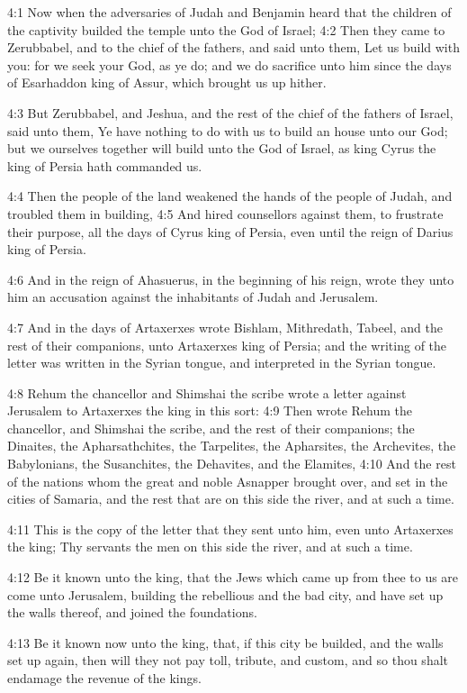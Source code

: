 4:1 Now when the adversaries of Judah and Benjamin heard that the children of the captivity builded the temple unto the \LORD God of Israel; 4:2 Then they came to Zerubbabel, and to the chief of the fathers, and said unto them, Let us build with you: for we seek your God, as ye do; and we do sacrifice unto him since the days of Esarhaddon king of Assur, which brought us up hither.

4:3 But Zerubbabel, and Jeshua, and the rest of the chief of the fathers of Israel, said unto them, Ye have nothing to do with us to build an house unto our God; but we ourselves together will build unto the \LORD God of Israel, as king Cyrus the king of Persia hath commanded us.

4:4 Then the people of the land weakened the hands of the people of Judah, and troubled them in building, 4:5 And hired counsellors against them, to frustrate their purpose, all the days of Cyrus king of Persia, even until the reign of Darius king of Persia.

4:6 And in the reign of Ahasuerus, in the beginning of his reign, wrote they unto him an accusation against the inhabitants of Judah and Jerusalem.

4:7 And in the days of Artaxerxes wrote Bishlam, Mithredath, Tabeel, and the rest of their companions, unto Artaxerxes king of Persia; and the writing of the letter was written in the Syrian tongue, and interpreted in the Syrian tongue.

4:8 Rehum the chancellor and Shimshai the scribe wrote a letter against Jerusalem to Artaxerxes the king in this sort: 4:9 Then wrote Rehum the chancellor, and Shimshai the scribe, and the rest of their companions; the Dinaites, the Apharsathchites, the Tarpelites, the Apharsites, the Archevites, the Babylonians, the Susanchites, the Dehavites, and the Elamites, 4:10 And the rest of the nations whom the great and noble Asnapper brought over, and set in the cities of Samaria, and the rest that are on this side the river, and at such a time.

4:11 This is the copy of the letter that they sent unto him, even unto Artaxerxes the king; Thy servants the men on this side the river, and at such a time.

4:12 Be it known unto the king, that the Jews which came up from thee to us are come unto Jerusalem, building the rebellious and the bad city, and have set up the walls thereof, and joined the foundations.

4:13 Be it known now unto the king, that, if this city be builded, and the walls set up again, then will they not pay toll, tribute, and custom, and so thou shalt endamage the revenue of the kings.

